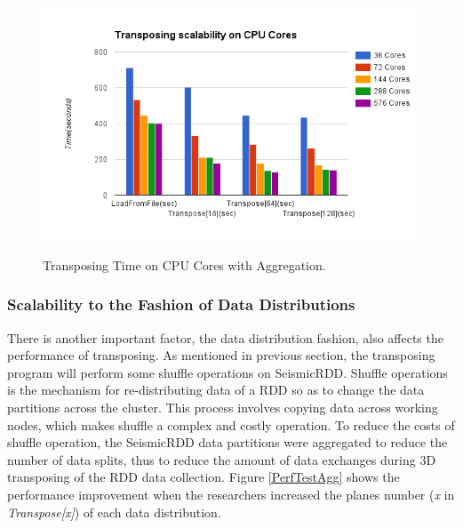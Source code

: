 \begin{figure}[h]
\centering
\includegraphics[scale=0.7]{figures/PerfTestCoresAgg.png}\\
\caption{Transposing Time on CPU Cores with Aggregation.}\label{PerfTestCoresAgg}
\end{figure}


\subsubsection{Scalability to the Fashion of Data Distributions}

There is another important factor, the data distribution fashion, also affects the performance of transposing. As mentioned in previous section, the transposing program will perform some shuffle operations on SeismicRDD. Shuffle operations \cite{SparkShuffle} is the mechanism for re-distributing data of a RDD so as to change the data partitions across the cluster. This process involves copying data across working nodes, which makes shuffle a complex and costly operation. To reduce the costs of shuffle operation, the SeismicRDD data partitions were aggregated to reduce the number of data splits, thus to reduce the amount of data exchanges during 3D transposing of the RDD data collection. Figure \ref{PerfTestAgg} shows the performance improvement when the researchers increased the planes number (\emph{x} in \emph{Transpose[x]}) of each data distribution. 


